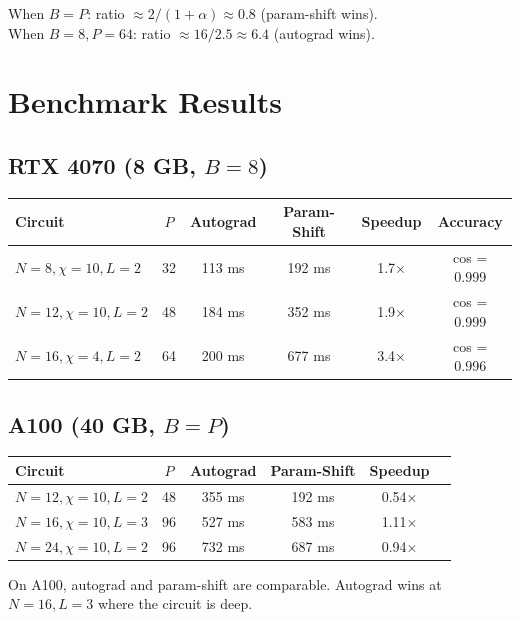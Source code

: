 \documentclass[11pt]{article}
\begin{document}
When $B = P$: ratio $\approx 2 / (1 + \alpha) \approx 0.8$ (param-shift wins).\\
When $B = 8, P = 64$: ratio $\approx 16 / 2.5 \approx 6.4$ (autograd wins).

\section{Benchmark Results}

\subsection{RTX 4070 (8 GB, $B = 8$)}
\begin{center}
\begin{tabular}{lccccc}
\toprule
Circuit & $P$ & Autograd & Param-Shift & Speedup & Accuracy \\
\midrule
$N=8, \chi=10, L=2$ & 32 & 113 ms & 192 ms & 1.7$\times$ & cos = 0.999 \\
$N=12, \chi=10, L=2$ & 48 & 184 ms & 352 ms & 1.9$\times$ & cos = 0.999 \\
$N=16, \chi=4, L=2$ & 64 & 200 ms & 677 ms & 3.4$\times$ & cos = 0.996 \\
\bottomrule
\end{tabular}
\end{center}

\subsection{A100 (40 GB, $B = P$)}
\begin{center}
\begin{tabular}{lccccc}
\toprule
Circuit & $P$ & Autograd & Param-Shift & Speedup \\
\midrule
$N=12, \chi=10, L=2$ & 48 & 355 ms & 192 ms & 0.54$\times$ \\
$N=16, \chi=10, L=3$ & 96 & 527 ms & 583 ms & 1.11$\times$ \\
$N=24, \chi=10, L=2$ & 96 & 732 ms & 687 ms & 0.94$\times$ \\
\bottomrule
\end{tabular}
\end{center}

On A100, autograd and param-shift are comparable. Autograd wins at $N=16, L=3$ where the circuit is deep.
\end{document}
